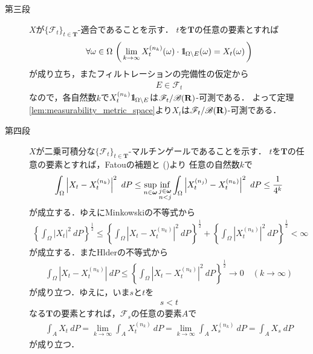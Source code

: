 \begin{sketch}
\begin{description}
			\item[第三段]
				$X$が$\{\mathscr{F}_t\}_{t \in \mathbf{T}}$-適合であることを示す．
				$t$を$\mathbf{T}$の任意の要素とすれば
				\begin{align}
					\forall \omega \in \Omega\, \left(\, 
					\lim_{k \to \infty} X_t^{(n_k)}(\omega) \cdot \mbox{1}\hspace{-0.25em}\mbox{l}_{\Omega \backslash E}(\omega) = X_t(\omega)\, \right)
				\end{align}
				が成り立ち，またフィルトレーションの完備性の仮定から
				\begin{align}
					E \in \mathscr{F}_t
				\end{align}
				なので，各自然数$k$で$X_t^{(n_k)} \mbox{1}\hspace{-0.25em}\mbox{l}_{\Omega \backslash E}$は$\mathscr{F}_t/\mathscr{B}(\mathbf{R})$-可測である．
				よって定理\ref{lem:measurability_metric_space}より$X_t$は$\mathscr{F}_t/\mathscr{B}(\mathbf{R})$-可測である．
				
			\item[第四段]
				$X$が二乗可積分な$\{\mathscr{F}_t\}_{t \in \mathbf{T}}$-マルチンゲールであることを示す．
				$t$を$\mathbf{T}$の任意の要素とすれば，Fatouの補題と
				()より
				任意の自然数$k$で
				\begin{align}
					\int_\Omega \left|X_t-X_t^{(n_k)}\right|^2\ dP
					\leq \sup{n \in \Natural}{\inf{\substack{j \in \Natural \\ n < j}}{
					\int_\Omega \left|X_t^{(n_j)}-X_t^{(n_k)}\right|^2\ dP}}
					\leq \frac{1}{4^k}
					\label{fom:thm_pseudo_metric_on_square_integrable_martingales_3}
 				\end{align}
 				が成立する．ゆえにMinkowskiの不等式から
 				\begin{align}
 					\left\{\int_\Omega |X_t|^2\ dP\right\}^{\frac{1}{2}}
 					\leq \left\{\int_\Omega \left|X_t - X^{(n_k)}_t\right|^2\ dP\right\}^{\frac{1}{2}}
 					+ \left\{\int_\Omega \left|X^{(n_k)}_t\right|^2\ dP\right\}^{\frac{1}{2}}
 					< \infty
 				\end{align}
 				が成立する．またHlderの不等式から
 				\begin{align}
 					\int_\Omega \left|X_t-X_t^{(n_k)}\right|\ dP
 					\leq \left\{\int_\Omega \left|X_t - X^{(n_k)}_t\right|^2\ dP\right\}^{\frac{1}{2}}
 					\longrightarrow 0\quad (k \longrightarrow \infty)
 				\end{align}
 				が成り立つ．ゆえに，いま$s$と$t$を
 				\begin{align}
 					s < t
 				\end{align}
 				なる$\mathbf{T}$の要素とすれば，$\mathscr{F}_s$の任意の要素$A$で
 				\begin{align}
 					\int_A X_t\ dP = \lim_{k \to \infty} \int_A X^{(n_k)}_t\ dP
 					= \lim_{k \to \infty} \int_A X^{(n_k)}_s\ dP
 					= \int_A X_s\ dP
 				\end{align}
 				が成り立つ．
 			

\end{description}
\end{sketch}
